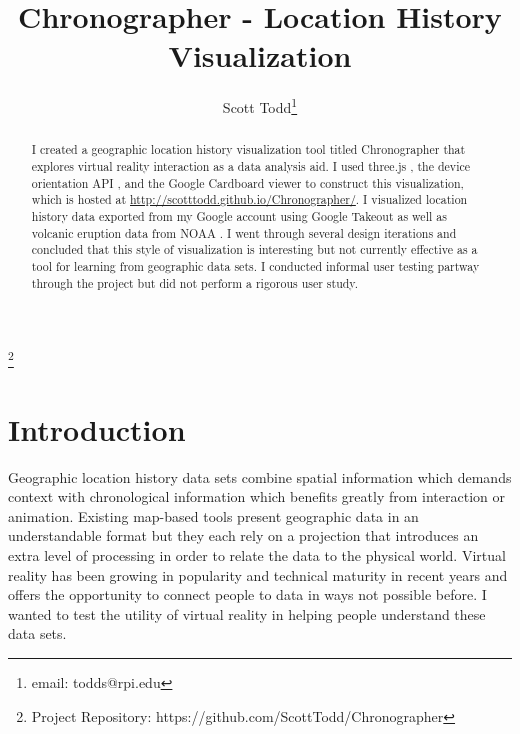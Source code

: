 \documentclass[conference]{acmsiggraph}
\title{Chronographer - Location History Visualization}
\author{Scott Todd\thanks{email: todds@rpi.edu}}
\newcommand\blfootnote[1]{%
  \begingroup
  \renewcommand\thefootnote{}\footnote{#1}%
  \addtocounter{footnote}{-1}%
  \endgroup
}
\begin{document}

\maketitle


\begin{abstract}

I created a geographic location history visualization tool titled Chronographer
that explores virtual reality interaction as a data analysis aid. I used
three.js \cite{three.js}, the device orientation API
\cite{Mozilla:DeviceOrientation}, and the Google Cardboard
\cite{Google:Cardboard} viewer to construct this visualization, which is hosted
at \url{http://scotttodd.github.io/Chronographer/}. I visualized location
history data exported from my Google account using Google Takeout
\cite{Google:Takeout} as well as volcanic eruption data from NOAA
\cite{NOAA:Volcano}. I went through several design iterations and concluded that
this style of visualization is interesting but not currently effective as a
tool for learning from geographic data sets. I conducted informal user testing
partway through the project but did not perform a rigorous user study.

\end{abstract}

\keywordlist

\TOGlinkslist

\blfootnote{Project Repository: https://github.com/ScottTodd/Chronographer}

\copyrightspace


\section{Introduction}

Geographic location history data sets combine spatial information which demands
context with chronological information which benefits greatly from interaction
or animation. Existing map-based tools present geographic data in an
understandable format but they each rely on a projection that introduces an
extra level of processing in order to relate the data to the physical world.
Virtual reality has been growing in popularity and technical maturity in recent
years and offers the opportunity to connect people to data in ways not possible
before. I wanted to test the utility of virtual reality in helping people
understand these data sets.
\end{document}
